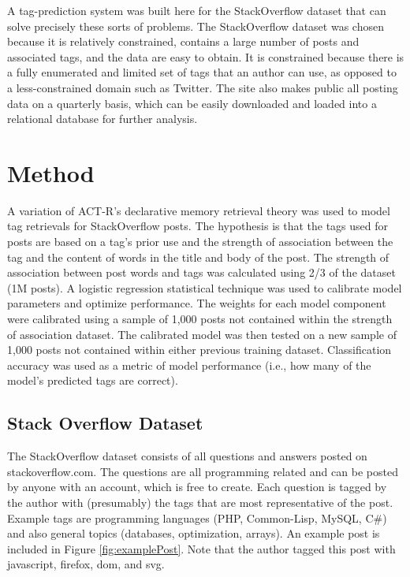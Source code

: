 \documentclass[10pt,letterpaper]{article}
\begin{document}
A tag-prediction system was built here for the StackOverflow dataset that can solve precisely these sorts of problems.
The StackOverflow dataset was chosen because it is relatively constrained, contains a large number of posts and associated tags, and the data are easy to obtain.
It is constrained because there is a fully enumerated and limited set of tags that an author can use, as opposed to a less-constrained domain such as Twitter.
The site also makes public all posting data on a quarterly basis, which can be easily downloaded and loaded into a relational database for further analysis.

\section{Method}

A variation of ACT-R's declarative memory retrieval theory \cite{Anderson2004} was used to model tag retrievals for StackOverflow posts.
The hypothesis is that the tags used for posts are based on a tag's prior use and the strength of association between the tag and the content of words in the title and body of the post.
The strength of association between post words and tags was calculated using 2/3 of the dataset (1M posts).
A logistic regression statistical technique was used to calibrate model parameters and optimize performance.
The weights for each model component were calibrated using a sample of 1,000 posts not contained within the strength of association dataset.
The calibrated model was then tested on a new sample of 1,000 posts not contained within either previous training dataset.
Classification accuracy was used as a metric of model performance (i.e., how many of the model's predicted tags are correct).

\subsection{Stack Overflow Dataset}

The StackOverflow dataset consists of all questions and answers posted on stackoverflow.com.
The questions are all programming related and can be posted by anyone with an account, which is free to create.
Each question is tagged by the author with (presumably) the tags that are most representative of the post.
Example tags are programming languages (PHP, Common-Lisp, MySQL, C\#) and also general topics (databases, optimization, arrays).
An example post is included in Figure \ref{fig:examplePost}.
Note that the author tagged this post with javascript, firefox, dom, and svg.
\end{document}
